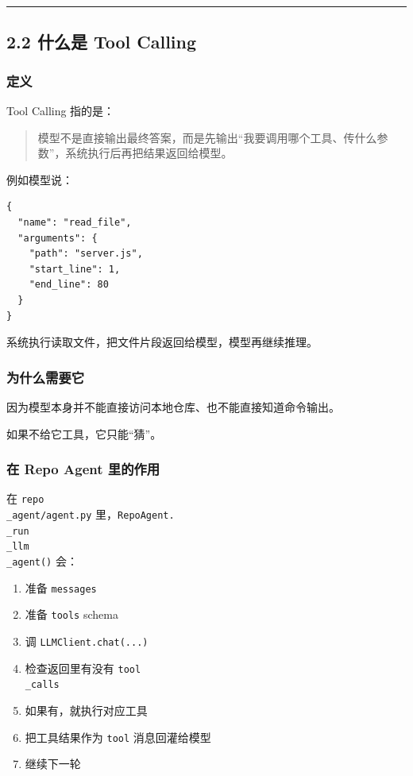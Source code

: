 \documentclass[UTF8,12pt,openany]{ctexbook}
\begin{document}
\hrule

\subsection{2.2 什么是 Tool Calling}

\subsubsection{定义}

Tool Calling 指的是：\par

\begin{quote}
模型不是直接输出最终答案，而是先输出“我要调用哪个工具、传什么参数”，系统执行后再把结果返回给模型。
\end{quote}

例如模型说：\par

\begin{lstlisting}
{
  "name": "read_file",
  "arguments": {
    "path": "server.js",
    "start_line": 1,
    "end_line": 80
  }
}
\end{lstlisting}

系统执行读取文件，把文件片段返回给模型，模型再继续推理。\par

\subsubsection{为什么需要它}

因为模型本身并不能直接访问本地仓库、也不能直接知道命令输出。  \par
如果不给它工具，它只能“猜”。\par

\subsubsection{在 Repo Agent 里的作用}

在 \texttt{repo\\_agent/agent.py} 里，\texttt{RepoAgent.\\_run\\_llm\\_agent()} 会：\par

\begin{enumerate}
\item 准备 \texttt{messages}
\item 准备 \texttt{tools} schema
\item 调 \texttt{LLMClient.chat(...)}
\item 检查返回里有没有 \texttt{tool\\_calls}
\item 如果有，就执行对应工具
\item 把工具结果作为 \texttt{tool} 消息回灌给模型
\item 继续下一轮
\end{enumerate}
\end{document}
